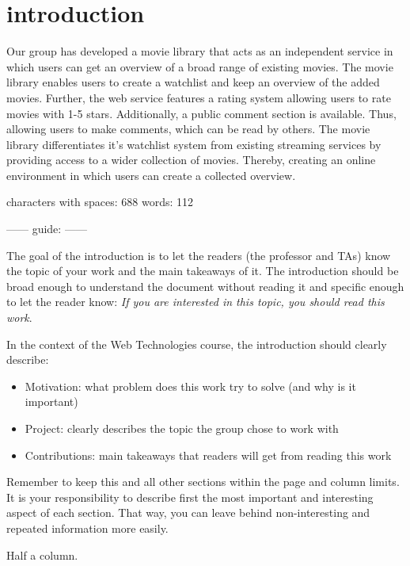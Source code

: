 \section{introduction}

Our group has developed a movie library that acts as an independent service in which users can get an overview of a broad range of existing movies. The movie library enables users to create a watchlist and keep an overview of the added movies. Further, the web service features a rating system allowing users to rate movies with 1-5 stars. Additionally, a public comment section is available. Thus, allowing users to make comments, which can be read by others.\newline
The movie library differentiates it's watchlist system from existing streaming services by providing access to a wider collection of movies. Thereby, creating an online environment in which users can create a collected overview.

characters with spaces: 688
words: 112

------ guide: ------

\noindent The goal of the introduction is to let the readers (the professor and TAs) know the topic of your work and the main takeaways of it.
The introduction should be broad enough to understand the document without reading it and specific enough to let the reader know: \textit{If you are interested in this topic, you should read this work}.

\noindent In the context of the Web Technologies course, the introduction should clearly describe:

\begin{itemize}
    \item Motivation: what problem does this work try to solve (and why is it important)
    \item Project: clearly describes the topic the group chose to work with
    \item Contributions: main takeaways that readers will get from reading this work
\end{itemize}


\noindent Remember to keep this and all other sections within the page and column limits.
It is your responsibility to describe first the most important and interesting aspect of each section.
That way, you can leave behind non-interesting and repeated information more easily.

 Half a column.

